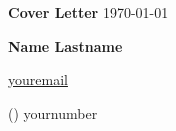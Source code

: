 \documentclass[11pt, a4paper]{article}
\begin{document}
\onehalfspacing

\hfill \textbf{\Large{Cover Letter}} \hfill \today
\newline
\newline
\lipsum[2:5]

\begin{center}
\textbf{\small{Name Lastname}}

\href{mailto:youremail}{\footnotesize youremail}

\footnotesize{() yournumber}
\end{center}
\end{document}
